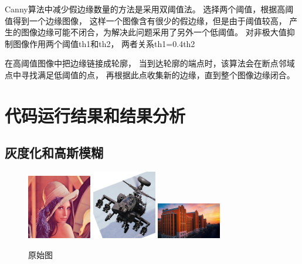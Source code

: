 \documentclass{article}
\begin{document}
    Canny算法中减少假边缘数量的方法是采用双阈值法。
    选择两个阈值，根据高阈值得到一个边缘图像，
    这样一个图像含有很少的假边缘，但是由于阈值较高，
    产生的图像边缘可能不闭合，为解决此问题采用了另外一个低阈值。
    对非极大值抑制图像作用两个阈值th1和th2，
    两者关系th1=0.4th2

    在高阈值图像中把边缘链接成轮廓，
    当到达轮廓的端点时，该算法会在断点邻域点中寻找满足低阈值的点，
    再根据此点收集新的边缘，直到整个图像边缘闭合。

\section{代码运行结果和结果分析}

\subsection{灰度化和高斯模糊}
\newpage

\begin{figure}[h]
    \centering
    \includegraphics[width=0.25\textwidth]{./dataset/1}
    \includegraphics[width=0.25\textwidth]{./dataset/2}
    \includegraphics[width=0.25\textwidth]{./dataset/3}
    \caption{原始图}
\end{figure}
\end{document}
